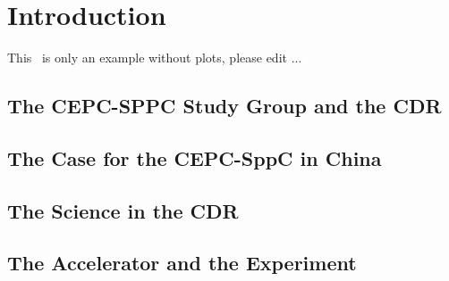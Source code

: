 \chapter{Introduction}
\label{Chapter:Introduction}

This~\cite{cepc_website} is only an example without plots, please edit ...

\section{The CEPC-SPPC Study Group and the CDR}


\section{The Case for the CEPC-SppC in China}


\section{The Science in the CDR}



\section{The Accelerator and the Experiment}



